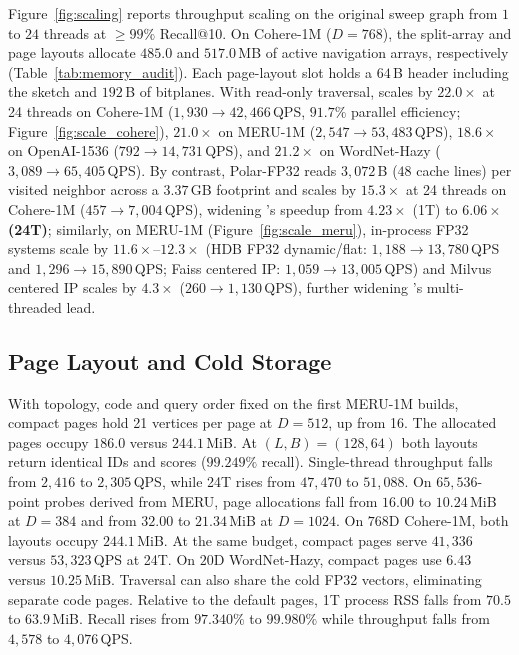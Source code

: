 Figure~\ref{fig:scaling} reports throughput scaling on the original sweep graph from $1$ to $24$ threads at $\ge 99\%$ Recall@10.
On {Cohere-1M} ($D=768$), the split-array and page layouts allocate $485.0$ and $517.0$\,MB of active navigation arrays, respectively (Table~\ref{tab:memory_audit}). Each page-layout slot holds a $64$\,B header including the sketch and $192$\,B of bitplanes. With read-only traversal, \rquiver{} scales by \textbf{$22.0\times$} at 24 threads on {Cohere-1M} ($1{,}930 \to 42{,}466$\,QPS, $91.7\%$ parallel efficiency; Figure~\ref{fig:scale_cohere}), \textbf{$21.0\times$} on {MERU-1M} ($2{,}547 \to 53{,}483$\,QPS), \textbf{$18.6\times$} on {OpenAI-1536} ($792 \to 14{,}731$\,QPS), and \textbf{$21.2\times$} on {WordNet-Hazy} ($3{,}089 \to 65{,}405$\,QPS).
By contrast, {Polar-FP32} reads $3{,}072$\,B ($48$ cache lines) per visited neighbor across a $3.37$\,GB footprint and scales by $15.3\times$ at 24 threads on {Cohere-1M} ($457 \to 7{,}004$\,QPS), widening \rquiver{}'s speedup from $4.23\times$ (1T) to \textbf{$6.06\times$ (24T)}; similarly, on {MERU-1M} (Figure~\ref{fig:scale_meru}), in-process FP32 systems scale by $11.6\times\text{--}12.3\times$ ({HDB FP32 dynamic/flat}: $1{,}188 \to 13{,}780$\,QPS and $1{,}296 \to 15{,}890$\,QPS; {Faiss centered IP}: $1{,}059 \to 13{,}005$\,QPS) and {Milvus centered IP} scales by $4.3\times$ ($260 \to 1{,}130$\,QPS), further widening \rquiver{}'s multi-threaded lead.

\subsection{Page Layout and Cold Storage}
\label{subsec:eval_storage}

With topology, code and query order fixed on the first {MERU-1M} builds, compact pages hold 21 vertices per page at $D=512$, up from 16. The allocated pages occupy $186.0$ versus $244.1$\,MiB. At $(L,B)=(128,64)$ both layouts return identical IDs and scores ($99.249\%$ recall). Single-thread throughput falls from $2{,}416$ to $2{,}305$\,QPS, while 24T rises from $47{,}470$ to $51{,}088$. On $65{,}536$-point probes derived from MERU, page allocations fall from $16.00$ to $10.24$\,MiB at $D=384$ and from $32.00$ to $21.34$\,MiB at $D=1024$. On $768$D {Cohere-1M}, both layouts occupy $244.1$\,MiB. At the same budget, compact pages serve $41{,}336$ versus $53{,}323$\,QPS at 24T. On $20$D {WordNet-Hazy}, compact pages use $6.43$ versus $10.25$\,MiB. Traversal can also share the cold FP32 vectors, eliminating separate code pages. Relative to the default pages, 1T process RSS falls from $70.5$ to $63.9$\,MiB. Recall rises from $97.340\%$ to $99.980\%$ while throughput falls from $4{,}578$ to $4{,}076$\,QPS.


